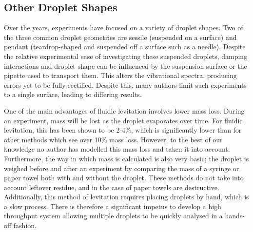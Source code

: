 \documentclass{physics_article_B}
\begin{document}
\subsection{Other Droplet Shapes}

Over the years, experiments have focused on a variety of droplet shapes. Two of the three common droplet geometries are sessile (suspended on a surface)\cite{Temperton2012, vukasinovic, Backholm2017} and pendant (teardrop-shaped and suspended off a surface such as a needle)\cite{Temperton2012}. Despite the relative experimental ease of investigating these suspended droplets, damping interactions and droplet shape can be influenced by the suspension surface or the pipette used to transport them\cite{Sharp2011}. This alters the vibrational spectra, producing errors yet to be fully rectified\cite{harrold}. Despite this, many authors limit such experiments to a single surface\cite{Sharp2011}, leading to differing results. %

One of the main advantages of fluidic levitation involves lower mass loss. During an experiment, mass will be lost as the droplet evaporates over time. For fluidic levitation, this has been shown to be 2-4\%, which is significantly lower than for other methods which see over 10\% \cite{harrold2} mass loss. However, to the best of our knowledge no author has modelled this mass loss and taken it into account. Furthermore, the way in which mass is calculated is also very basic; the droplet is weighed before and after an experiment by comparing the mass of a syringe or paper towel both with and without the droplet. These methods do not take into account leftover residue, and in the case of paper towels are destructive. Additionally, this method of levitation requires placing droplets by hand, which is a slow process. There is therefore a significant impetus to develop a high throughput system allowing multiple droplets to be quickly analysed in a hands-off fashion.

\end{document}
